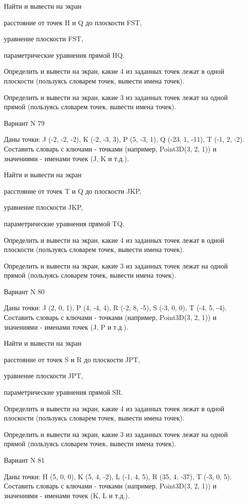 \documentclass[11pt]{report}
\begin{document}
Найти и вывести на экран


расстояние от точек H и Q до плоскости FST,


уравнение плоскости FST,


параметрические уравнения прямой HQ.


Определить и вывести на экран, какие 4 из заданных точек лежат в одной плоскости (пользуясь словарем точек, вывести имена точек).


Определить и вывести на экран, какие 3 из заданных точек лежат на одной прямой (пользуясь словарем точек, вывести имена точек).

\newpage
Вариант N 79

Даны точки: J (-2, -2, -2), K (-2, -3, 3), P (5, -3, 1), Q (-23, 1, -11), T (-1, 2, -2).
Составить словарь с ключами - точками (например, Point3D(3, 2, 1)) и значениями - именами точек (J, K и т.д.).


Найти и вывести на экран


расстояние от точек T и Q до плоскости JKP,


уравнение плоскости JKP,


параметрические уравнения прямой TQ.


Определить и вывести на экран, какие 4 из заданных точек лежат в одной плоскости (пользуясь словарем точек, вывести имена точек).


Определить и вывести на экран, какие 3 из заданных точек лежат на одной прямой (пользуясь словарем точек, вывести имена точек).

\newpage
Вариант N 80

Даны точки: J (2, 0, 1), P (4, -4, 4), R (-2, 8, -5), S (-3, 0, 0), T (-4, 5, -4).
Составить словарь с ключами - точками (например, Point3D(3, 2, 1)) и значениями - именами точек (J, P и т.д.).


Найти и вывести на экран


расстояние от точек S и R до плоскости JPT,


уравнение плоскости JPT,


параметрические уравнения прямой SR.


Определить и вывести на экран, какие 4 из заданных точек лежат в одной плоскости (пользуясь словарем точек, вывести имена точек).


Определить и вывести на экран, какие 3 из заданных точек лежат на одной прямой (пользуясь словарем точек, вывести имена точек).

\newpage
Вариант N 81

Даны точки: H (5, 0, 0), K (5, 4, -2), L (-1, 4, 5), R (35, 4, -37), T (-3, 0, 5).
Составить словарь с ключами - точками (например, Point3D(3, 2, 1)) и значениями - именами точек (K, L и т.д.).
\end{document}
